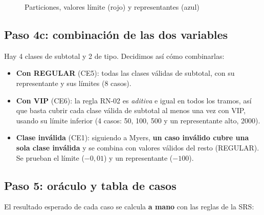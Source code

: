 \documentclass[11pt,a4paper,oneside]{report}
\begin{document}
\begin{figure}[H]
\centering
{}
\caption{Particiones, valores límite (rojo) y representantes (azul)}
\end{figure}

\subsection{Paso 4c: combinación de las dos variables}
Hay 4 clases de subtotal y 2 de tipo. Decidimos así cómo combinarlas:
\begin{itemize}
  \item \textbf{Con REGULAR} (CE5): todas las clases válidas de subtotal, con su representante y sus límites (8 casos).
  \item \textbf{Con VIP} (CE6): la regla RN-02 es \emph{aditiva} e igual en todos los tramos, así que basta cubrir cada clase válida de subtotal al menos una vez con VIP, usando su límite inferior (4 casos: 50, 100, 500 y un representante alto, 2000).
  \item \textbf{Clase inválida} (CE1): siguiendo a Myers, \textbf{un caso inválido cubre una sola clase inválida} y se combina con valores válidos del resto (REGULAR). Se prueban el límite ($-0{,}01$) y un representante ($-100$).
\end{itemize}

\subsection{Paso 5: oráculo y tabla de casos}
El resultado esperado de cada caso se calcula \textbf{a mano} con las reglas de la SRS:
\end{document}
